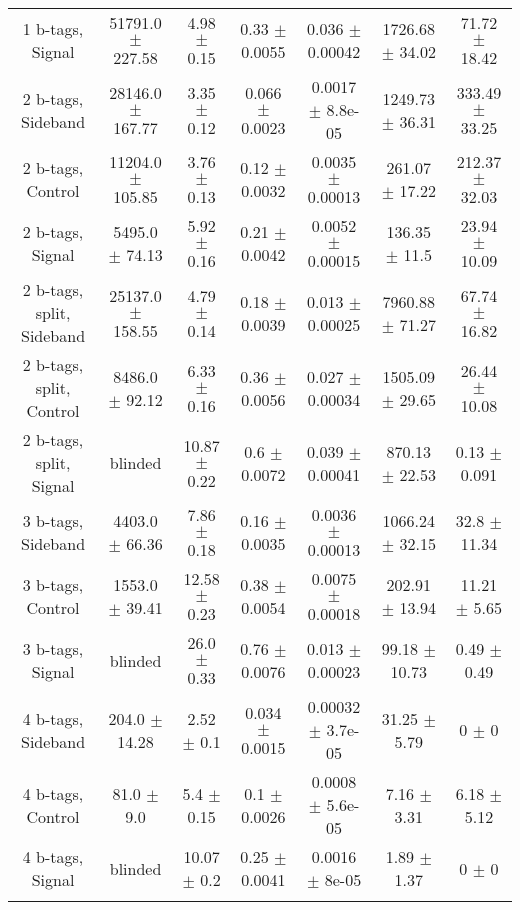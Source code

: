 \begin{footnotesize}
\begin{tabular}{c|c|c|c|c|c|c}
1 b-tags, Signal & 51791.0 $\pm$ 227.58 & 4.98 $\pm$ 0.15 & 0.33 $\pm$ 0.0055 & 0.036 $\pm$ 0.00042 & 1726.68 $\pm$ 34.02 & 71.72 $\pm$ 18.42\\ 
2 b-tags, Sideband & 28146.0 $\pm$ 167.77 & 3.35 $\pm$ 0.12 & 0.066 $\pm$ 0.0023 & 0.0017 $\pm$ 8.8e-05 & 1249.73 $\pm$ 36.31 & 333.49 $\pm$ 33.25\\ 
2 b-tags, Control & 11204.0 $\pm$ 105.85 & 3.76 $\pm$ 0.13 & 0.12 $\pm$ 0.0032 & 0.0035 $\pm$ 0.00013 & 261.07 $\pm$ 17.22 & 212.37 $\pm$ 32.03\\ 
2 b-tags, Signal & 5495.0 $\pm$ 74.13 & 5.92 $\pm$ 0.16 & 0.21 $\pm$ 0.0042 & 0.0052 $\pm$ 0.00015 & 136.35 $\pm$ 11.5 & 23.94 $\pm$ 10.09\\ 
2 b-tags, split, Sideband & 25137.0 $\pm$ 158.55 & 4.79 $\pm$ 0.14 & 0.18 $\pm$ 0.0039 & 0.013 $\pm$ 0.00025 & 7960.88 $\pm$ 71.27 & 67.74 $\pm$ 16.82\\ 
2 b-tags, split, Control & 8486.0 $\pm$ 92.12 & 6.33 $\pm$ 0.16 & 0.36 $\pm$ 0.0056 & 0.027 $\pm$ 0.00034 & 1505.09 $\pm$ 29.65 & 26.44 $\pm$ 10.08\\ 
2 b-tags, split, Signal &  blinded  & 10.87 $\pm$ 0.22 & 0.6 $\pm$ 0.0072 & 0.039 $\pm$ 0.00041 & 870.13 $\pm$ 22.53 & 0.13 $\pm$ 0.091\\ 
3 b-tags, Sideband & 4403.0 $\pm$ 66.36 & 7.86 $\pm$ 0.18 & 0.16 $\pm$ 0.0035 & 0.0036 $\pm$ 0.00013 & 1066.24 $\pm$ 32.15 & 32.8 $\pm$ 11.34\\ 
3 b-tags, Control & 1553.0 $\pm$ 39.41 & 12.58 $\pm$ 0.23 & 0.38 $\pm$ 0.0054 & 0.0075 $\pm$ 0.00018 & 202.91 $\pm$ 13.94 & 11.21 $\pm$ 5.65\\ 
3 b-tags, Signal &  blinded  & 26.0 $\pm$ 0.33 & 0.76 $\pm$ 0.0076 & 0.013 $\pm$ 0.00023 & 99.18 $\pm$ 10.73 & 0.49 $\pm$ 0.49\\ 
4 b-tags, Sideband & 204.0 $\pm$ 14.28 & 2.52 $\pm$ 0.1 & 0.034 $\pm$ 0.0015 & 0.00032 $\pm$ 3.7e-05 & 31.25 $\pm$ 5.79 & 0 $\pm$ 0\\ 
4 b-tags, Control & 81.0 $\pm$ 9.0 & 5.4 $\pm$ 0.15 & 0.1 $\pm$ 0.0026 & 0.0008 $\pm$ 5.6e-05 & 7.16 $\pm$ 3.31 & 6.18 $\pm$ 5.12\\ 
4 b-tags, Signal &  blinded  & 10.07 $\pm$ 0.2 & 0.25 $\pm$ 0.0041 & 0.0016 $\pm$ 8e-05 & 1.89 $\pm$ 1.37 & 0 $\pm$ 0\\ 
& & & & & & \\ 
\hline\hline 
\end{tabular} 
\end{footnotesize} 
\newline 
